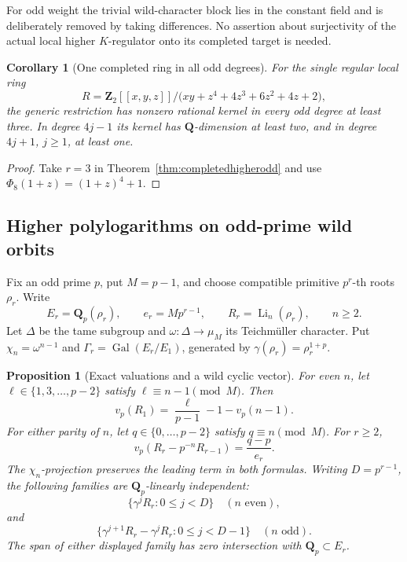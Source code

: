 \documentclass[11pt,a4paper]{article}
\newtheorem{proposition}[theorem]{Proposition}
\newtheorem{corollary}[theorem]{Corollary}
\theoremstyle{remark}
\newcommand{\Q}{\mathbf Q}
\newcommand{\Z}{\mathbf Z}
\newcommand{\Gal}{\operatorname{Gal}}
\begin{document}
For odd weight the trivial wild-character block lies in the
constant field and is deliberately removed by taking differences.
No assertion about surjectivity of the actual local higher
$K$-regulator onto its completed target is needed.


\begin{corollary}[One completed ring in all odd degrees]
For the single regular local ring
\[
 R=\Z_2[[x,y,z]]/
 \bigl(xy+z^4+4z^3+6z^2+4z+2\bigr),
\]
the generic restriction has nonzero rational kernel in every
odd degree at least three. In degree $4j-1$ its kernel has
$\Q$-dimension at least two, and in degree $4j+1$, $j\geq1$,
at least one.
\end{corollary}
\begin{proof}
Take $r=3$ in Theorem~\ref{thm:completedhigherodd} and use
$\Phi_8(1+z)=(1+z)^4+1$.
\end{proof}


\subsection{Higher polylogarithms on odd-prime wild orbits}
\label{sec:oddprimehigherwild}

Fix an odd prime $p$, put $M=p-1$, and choose compatible primitive
$p^r$-th roots $\rho_r$. Write
\[
 E_r=\Q_p(\rho_r),\qquad e_r=Mp^{r-1},\qquad
 R_r=\operatorname{Li}_n(\rho_r),\qquad n\geq2.
\]
Let $\Delta$ be the tame subgroup and $\omega:\Delta\to\mu_M$
its Teichm\"uller character. Put $\chi_n=\omega^{n-1}$ and
$\Gamma_r=\Gal(E_r/E_1)$, generated by
$\gamma(\rho_r)=\rho_r^{1+p}$.

\begin{proposition}[Exact valuations and a wild cyclic vector]
\label{prop:oddprimehigherwild}
For even $n$, let $\ell\in\{1,3,\ldots,p-2\}$ satisfy
$\ell\equiv n-1\pmod M$. Then
\begin{equation}\label{eq:oddprimehigherbase}
 v_p(R_1)=\frac{\ell}{p-1}-1-v_p(n-1).
\end{equation}
For either parity of $n$, let $q\in\{0,\ldots,p-2\}$ satisfy
$q\equiv n\pmod M$. For $r\geq2$,
\begin{equation}\label{eq:oddprimehighernew}
 v_p(R_r-p^{-n}R_{r-1})=\frac{q-p}{e_r}.
\end{equation}
The $\chi_n$-projection preserves the leading term in both formulas.
Writing $D=p^{r-1}$, the following families are $\Q_p$-linearly
independent:
\[
 \{\gamma^jR_r:0\leq j<D\}\quad(n\text{ even}),
\]
and
\[
 \{\gamma^{j+1}R_r-\gamma^jR_r:0\leq j<D-1\}
                                  \quad(n\text{ odd}).
\]
The span of either displayed family has zero intersection with
$\Q_p\subset E_r$.
\end{proposition}
\end{document}
